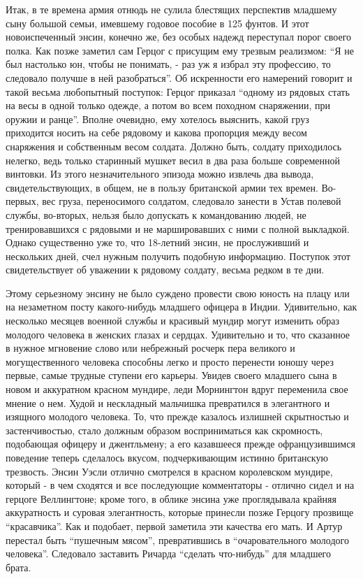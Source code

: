 \documentclass[
  oneside,
  12pt,
  titlepage]{book}
\begin{document}
Итак, в те времена армия отнюдь не сулила блестящих перспектив младшему сыну большой семьи, имевшему годовое пособие в 125 фунтов. И этот новоиспеченный энсин, конечно же, без особых надежд переступал порог своего полка. Как позже заметил сам Герцог с присущим ему трезвым реализмом: ``Я не был настолько юн, чтобы не понимать, - раз уж я избрал эту профессию, то следовало получше в ней разобраться''. Об искренности его намерений говорит и такой весьма любопытный поступок: Герцог приказал ``одному из рядовых стать на весы в одной только одежде, а потом во всем походном снаряжении, при оружии и ранце''. Вполне очевидно, ему хотелось выяснить, какой груз приходится носить на себе рядовому и какова пропорция между весом снаряжения и собственным весом солдата. Должно быть, солдату приходилось нелегко, ведь только старинный мушкет весил в два раза больше современной винтовки. Из этого незначительного эпизода можно извлечь два вывода, свидетельствующих, в общем, не в пользу британской армии тех времен. Во-первых, вес груза, переносимого солдатом, следовало занести в Устав полевой службы, во-вторых, нельзя было допускать к командованию людей, не тренировавшихся с рядовыми и не маршировавших с ними с полной выкладкой. Однако существенно уже то, что 18-летний энсин, не прослуживший и нескольких дней, счел нужным получить подобную информацию. Поступок этот свидетельствует об уважении к рядовому солдату, весьма редком в те дни.

Этому серьезному энсину не было суждено провести свою юность на плацу или на незаметном посту какого-нибудь младшего офицера в Индии. Удивительно, как несколько месяцев военной службы и красивый мундир могут изменить образ молодого человека в женских глазах и сердцах. Удивительно и то, что сказанное в нужное мгновение слово или небрежный росчерк пера великого и могущественного человека способны легко и просто перенести юношу через первые, самые трудные ступени его карьеры. Увидев своего младшего сына в новом и аккуратном красном мундире, леди Морнингтон вдруг переменила свое мнение о нем. Худой и нескладный мальчишка превратился в элегантного и изящного молодого человека. То, что прежде казалось излишней скрытностью и застенчивостью, стало должным образом восприниматься как скромность, подобающая офицеру и джентльмену; а его казавшееся прежде офранцузившимся поведение теперь сделалось вкусом, подчеркивающим истинно британскую трезвость. Энсин Уэсли отлично смотрелся в красном королевском мундире, который - в чем сходятся и все последующие комментаторы - отлично сидел и на герцоге Веллингтоне; кроме того, в облике энсина уже проглядывала крайняя аккуратность и суровая элегантность, которые принесли позже Герцогу прозвище ``красавчика''. Как и подобает, первой заметила эти качества его мать. И Артур перестал быть ``пушечным мясом'', превратившись в ``очаровательного молодого человека''. Следовало заставить Ричарда ``сделать что-нибудь'' для младшего брата.
\end{document}
